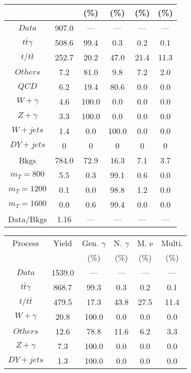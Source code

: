 \begin{figure}
\begin{minipage}[c]{0.32\textwidth}
{\begin{tabular}{cccccc}
 &  & (\%) & (\%) & (\%) & (\%)  \\
\hline
                                                                      $ Data $ &  907.0 &  --- &  --- &  --- &  ---\\
$ t\bar{t}\gamma $ &  508.6 &  99.4 &  0.3 &  0.2 &  0.1\\
$ t/t\bar{t} $ &  252.7 &  20.2 &  47.0 &  21.4 &  11.3\\
$ Others $ &  7.2 &  81.0 &  9.8 &  7.2 &  2.0\\
$ QCD $ &  6.2 &  19.4 &  80.6 &  0.0 &  0.0\\
$ W+\gamma $ &  4.6 &  100.0 &  0.0 &  0.0 &  0.0\\
$ Z+\gamma $ &  3.3 &  100.0 &  0.0 &  0.0 &  0.0\\
$ W+jets $ &  1.4 &  0.0 &  100.0 &  0.0 &  0.0\\
$ DY+jets $ &  0 &  0 &  0 &  0 &  0\\
Bkgs &  784.0 &  72.9 &  16.3 &  7.1 &  3.7\\
$ m_{T} = 800 $ &  5.5 &  0.3 &  99.1 &  0.6 &  0.0\\
$ m_{T} = 1200 $ &  0.1 &  0.0 &  98.8 &  1.2 &  0.0\\
$ m_{T} = 1600 $ &  0.0 &  0.6 &  99.4 &  0.0 &  0.0\\
Data/Bkgs &  1.16 &  --- &  --- &  --- &  ---\\
\hline
\end{tabular}
}
\end{minipage}
\begin{minipage}[c]{0.32\textwidth}
\centering
\tiny{
\begin{tabular}{cccccc}
\hline
Process & Yield & Gen. $\gamma$ & N. $\gamma$ & M. e & Multi. \\
 &  & (\%) & (\%) & (\%) & (\%)  \\
\hline
                                                                      $ Data $ &  1539.0 &  --- &  --- &  --- &  ---\\
$ t\bar{t}\gamma $ &  868.7 &  99.3 &  0.3 &  0.2 &  0.1\\
$ t/t\bar{t} $ &  479.5 &  17.3 &  43.8 &  27.5 &  11.4\\
$ W+\gamma $ &  20.8 &  100.0 &  0.0 &  0.0 &  0.0\\
$ Others $ &  12.6 &  78.8 &  11.6 &  6.2 &  3.3\\
$ Z+\gamma $ &  7.3 &  100.0 &  0.0 &  0.0 &  0.0\\
$ DY+jets $ &  1.3 &  100.0 &  0.0 &  0.0 &  0.0\\

\end{tabular}}
\end{minipage}
\end{figure}
